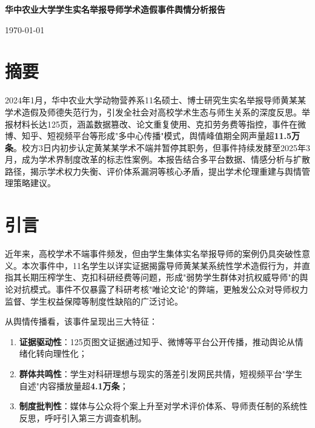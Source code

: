 \documentclass[12pt,a4paper]{article}
\begin{document}
\begin{titlepage}
    \centering
    \vspace*{2cm}
    {\LARGE\bfseries 华中农业大学学生实名举报导师学术造假事件舆情分析报告\par}
    \vspace{3cm}
    \begin{flushright}
    \large \today
    \end{flushright}
    \vfill
\end{titlepage}

\tableofcontents
\newpage

\section{摘要}
2024年1月，华中农业大学动物营养系11名硕士、博士研究生实名举报导师黄某某学术造假及师德失范行为，引发全社会对高校学术生态与师生关系的深度反思。举报材料长达125页，涵盖数据篡改、论文重复使用、克扣劳务费等指控，事件在微博、知乎、短视频平台等形成"多中心传播"模式，舆情峰值期全网声量超\textbf{11.5万条}。校方3日内初步认定黄某某学术不端并暂停其职务，但事件持续发酵至2025年3月，成为学术界制度改革的标志性案例。本报告结合多平台数据、情感分析与扩散路径，揭示学术权力失衡、评价体系漏洞等核心矛盾，提出学术伦理重建与舆情管理策略建议。

\section{引言}
近年来，高校学术不端事件频发，但由学生集体实名举报导师的案例仍具突破性意义。本次事件中，11名学生以详实证据揭露导师黄某某系统性学术造假行为，并直指其长期压榨学生、克扣科研经费等问题，形成"弱势学生群体对抗权威导师"的舆论对抗模式。事件不仅暴露了科研考核"唯论文论"的弊端，更触发公众对导师权力监督、学生权益保障等制度性缺陷的广泛讨论。

从舆情传播看，该事件呈现出三大特征：
\begin{enumerate}
    \item \textbf{证据驱动性}：125页图文证据通过知乎、微博等平台公开传播，推动舆论从情绪化转向理性化；
    \item \textbf{群体共鸣性}：学生对科研理想与现实的落差引发网民共情，短视频平台"学生自述"内容播放量超\textbf{4.1万条}；
    \item \textbf{制度批判性}：媒体与公众将个案上升至对学术评价体系、导师责任制的系统性反思，呼吁引入第三方调查机制。
\end{enumerate}
\end{document}
